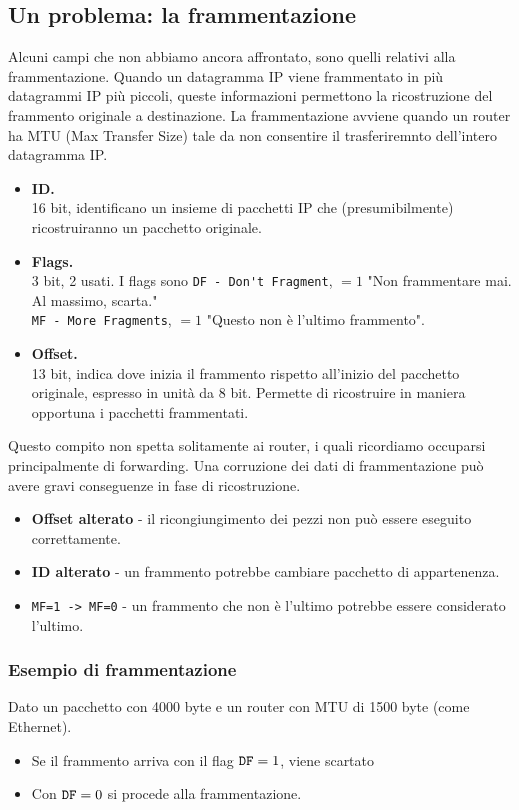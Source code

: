 \subsection{Un problema: la frammentazione}
Alcuni campi che non abbiamo ancora affrontato, sono quelli relativi alla frammentazione. Quando un datagramma IP viene frammentato in più datagrammi IP più piccoli, queste informazioni permettono la ricostruzione del frammento originale a destinazione.
La frammentazione avviene quando un router ha MTU (Max Transfer Size) tale da non consentire il trasferiremnto dell'intero datagramma IP.
\begin{itemize}
	\item \textbf{ID.}\\
	16 bit, identificano un insieme di pacchetti IP che (presumibilmente) ricostruiranno un pacchetto originale.
	\item \textbf{Flags.}\\
	3 bit, 2 usati. I flags sono \verb|DF - Don't Fragment|, $=1$ "Non frammentare mai. Al massimo, scarta."\\
	\verb|MF - More Fragments|, $=1$ "Questo non è l'ultimo frammento".
	\item \textbf{Offset.}\\
	13 bit, indica dove inizia il frammento rispetto all'inizio del pacchetto originale, espresso in unità da 8 bit. Permette di ricostruire in maniera opportuna i pacchetti frammentati.
\end{itemize}

Questo compito non spetta solitamente ai router, i quali ricordiamo occuparsi principalmente di forwarding. Una corruzione dei dati di frammentazione può avere gravi conseguenze in fase di ricostruzione.

\begin{itemize}
	\item \textbf{Offset alterato} - il ricongiungimento dei pezzi non può essere eseguito correttamente.
	\item \textbf{ID alterato} - un frammento potrebbe cambiare pacchetto di appartenenza.
	\item \verb|MF=1 -> MF=0| - un frammento che non è l'ultimo potrebbe essere considerato l'ultimo.
\end{itemize}

\subsubsection{Esempio di frammentazione}
Dato un pacchetto con 4000 byte e un router con MTU di 1500 byte (come Ethernet).
\begin{itemize}
	\item Se il frammento arriva con il flag $\verb|DF|= 1$, viene scartato
	\item Con $\verb|DF|=0$ si procede alla frammentazione.
\end{itemize}

